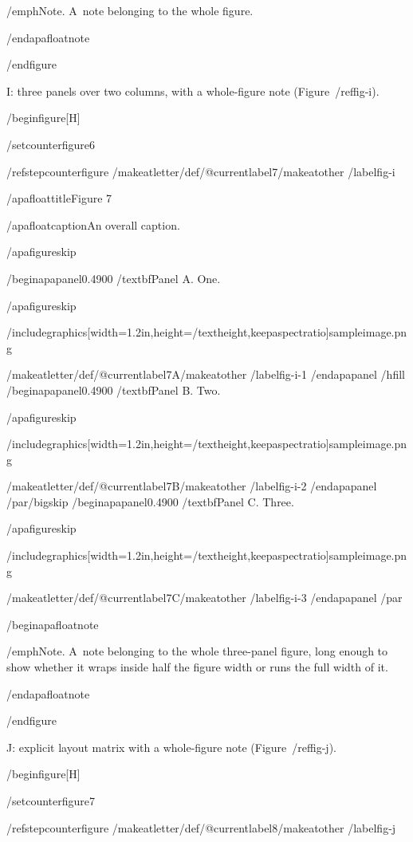 /emph{Note}. A~note belonging to the whole figure.

/end{apafloatnote}

/end{figure}

I: three panels over two columns, with a whole-figure note
(Figure~/ref{fig-i}).

/begin{figure}[H]

/setcounter{figure}{6}

/refstepcounter{figure}%
/makeatletter/def/@currentlabel{7}/makeatother%
/label{fig-i}

/apafloattitle{Figure 7}

/apafloatcaption{An overall caption.}

/apafigureskip

/begin{apapanel}{0.4900}%
/textbf{Panel A}. One.

/apafigureskip

/includegraphics[width=1.2in,height=/textheight,keepaspectratio]{sampleimage.png}

/makeatletter/def/@currentlabel{7A}/makeatother%
/label{fig-i-1}
/end{apapanel}%
/hfill
/begin{apapanel}{0.4900}%
/textbf{Panel B}. Two.

/apafigureskip

/includegraphics[width=1.2in,height=/textheight,keepaspectratio]{sampleimage.png}

/makeatletter/def/@currentlabel{7B}/makeatother%
/label{fig-i-2}
/end{apapanel}%
/par/bigskip
/begin{apapanel}{0.4900}%
/textbf{Panel C}. Three.

/apafigureskip

/includegraphics[width=1.2in,height=/textheight,keepaspectratio]{sampleimage.png}

/makeatletter/def/@currentlabel{7C}/makeatother%
/label{fig-i-3}
/end{apapanel}%
/par

/begin{apafloatnote}

/emph{Note}. A~note belonging to the whole three-panel figure, long
enough to show whether it wraps inside half the figure width or runs the
full width of it.

/end{apafloatnote}

/end{figure}

J: explicit layout matrix with a whole-figure note (Figure~/ref{fig-j}).

/begin{figure}[H]

/setcounter{figure}{7}

/refstepcounter{figure}%
/makeatletter/def/@currentlabel{8}/makeatother%
/label{fig-j}

